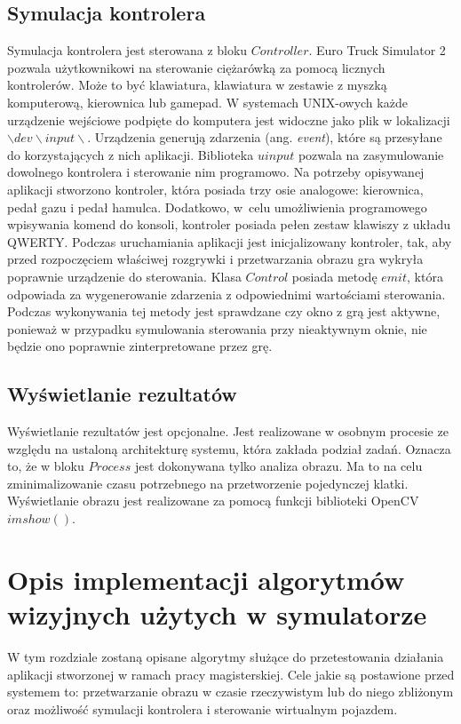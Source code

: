 \subsection{Symulacja kontrolera}
Symulacja kontrolera jest sterowana z bloku $Controller$.
Euro Truck Simulator 2 pozwala użytkownikowi na sterowanie ciężarówką za pomocą licznych kontrolerów. 
Może to być klawiatura, klawiatura w zestawie z myszką komputerową, kierownica lub gamepad. 
W systemach UNIX-owych każde urządzenie wejściowe podpięte do komputera jest widoczne jako plik w lokalizacji $\backslash dev\backslash input\backslash $. 
Urządzenia generują zdarzenia (ang. \textit{event}), które są przesyłane do korzystających z nich aplikacji.
Biblioteka $uinput$ pozwala na zasymulowanie dowolnego kontrolera i sterowanie nim programowo. 
Na potrzeby opisywanej aplikacji stworzono kontroler, która posiada trzy osie analogowe: kierownica, pedał gazu i pedał hamulca. 
Dodatkowo, w~celu umożliwienia programowego wpisywania komend do konsoli, kontroler posiada pełen zestaw klawiszy z układu QWERTY. %
Podczas uruchamiania aplikacji jest inicjalizowany kontroler, tak, aby przed rozpoczęciem właściwej rozgrywki i przetwarzania obrazu gra wykryła poprawnie urządzenie do sterowania. %
Klasa $Control$ posiada metodę $emit$, która odpowiada za wygenerowanie zdarzenia z odpowiednimi wartościami sterowania. 
Podczas wykonywania tej metody jest sprawdzane czy okno z grą jest aktywne, ponieważ w przypadku symulowania sterowania przy nieaktywnym oknie, nie będzie ono poprawnie zinterpretowane przez grę. %

\subsection{Wyświetlanie rezultatów}

Wyświetlanie rezultatów jest opcjonalne. 
Jest realizowane w osobnym procesie ze względu na ustaloną architekturę systemu, która zakłada podział zadań. Oznacza to, że w bloku $Process$ jest dokonywana tylko analiza obrazu. Ma to na celu zminimalizowanie czasu potrzebnego na przetworzenie pojedynczej klatki. %
Wyświetlanie obrazu jest realizowane za pomocą funkcji biblioteki OpenCV $imshow()$.


\section{Opis implementacji algorytmów wizyjnych użytych w symulatorze}
\label{sec:implem}
W tym rozdziale zostaną opisane algorytmy służące do przetestowania działania aplikacji stworzonej w ramach pracy magisterskiej. %
Cele jakie są postawione przed systemem to: przetwarzanie obrazu w czasie rzeczywistym lub do niego zbliżonym oraz możliwość symulacji kontrolera i sterowanie wirtualnym pojazdem. %


